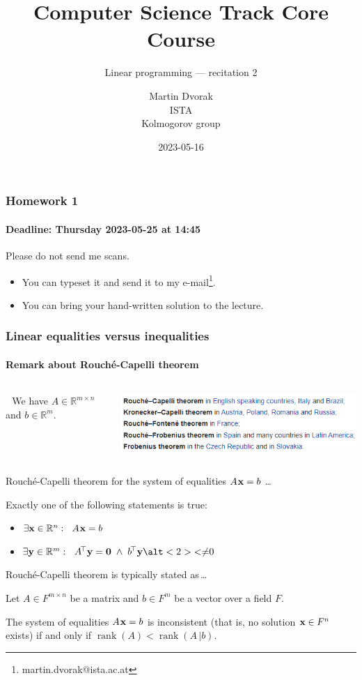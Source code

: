 \documentclass{beamer}
\title{Computer Science Track Core Course}
\subtitle{Linear programming --- recitation 2}
\author{Martin Dvorak\\ISTA\\Kolmogorov group}
\date{2023-05-16}
\renewcommand{\.}{\hskip .75pt}
\DeclareMathOperator{\aand}{~\wedge~}
\DeclareMathOperator{\rank}{rank}
\begin{document}
\begin{frame}
 	\titlepage
\end{frame}


\begin{frame}
	\frametitle{Homework 1}
	\framesubtitle{Deadline: Thursday 2023-05-25 at 14:45}
	
	Please do not send me scans.
	\begin{itemize}
	\item You can typeset it and send it to my e-mail\footnote{martin.dvorak@ista.ac.at}.
	\item You can bring your hand-written solution to the lecture.
	\end{itemize}

\end{frame}


\begin{frame}
	\frametitle{Linear equalities versus inequalities}
	\framesubtitle{Remark about Rouché-Capelli theorem}
	
	\begin{columns} 
		\begin{column}{0.55\textwidth}
			\;\;\,\, We have $A \in \mathbb{R}^{m \times n}$ and	$b \in \mathbb{R}^{m}$.
		\end{column}
	
		\begin{column}{0.5\textwidth}
			\includegraphics[width=\textwidth]{Rouche_wiki}
		\end{column}
	\end{columns}
	
	
	\smallskip
	
	{ \color{dred}
		Rouché-Capelli theorem for the system of equalities $A\. \bold{x} = b$ \dots
		
		Exactly one of the following statements is true:
	}
	\begin{itemize} \color{dred}
		\item $\exists \bold{x} \in \mathbb{R}^{n} : \ \; A\. \bold{x} = b$
		\item $\exists \bold{y} \in \mathbb{R}^{m} : \ \; A^{\!\top} \bold{y} = \bold{0} \aand b^{\!\top} \bold{y} \alt<2>{<}{\neq} 0$
	\end{itemize}
	\bigskip
	
	Rouché-Capelli theorem is typically stated as\,\dots
	
	Let $A \in F^{m \times n}$ be a matrix and $b \in F^{m}$ be a vector over a field $F$.
	
	The system of equalities $A\. \bold{x} = b$ is \textcolor{dgreen}{inconsistent} (that is, no solution $\bold{x} \in F^{n}$ exists) \textcolor{dgreen}{if and only if} $\rank(A) < \rank(A\,|b)$.

\end{frame}
\end{document}

